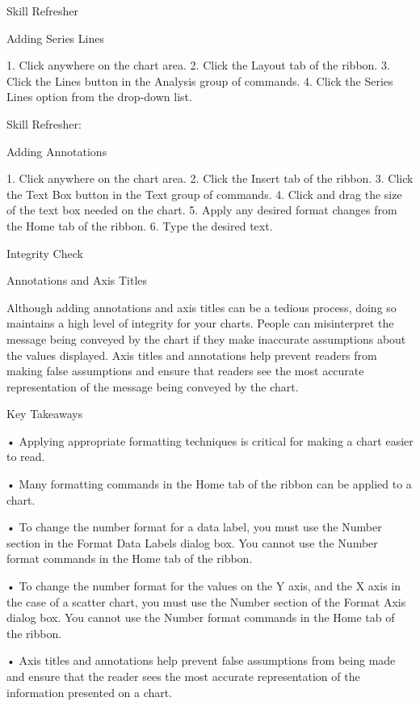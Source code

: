 Skill Refresher


Adding Series Lines

1. Click anywhere on the chart area.
2. Click the Layout tab of the ribbon.
3. Click the Lines button in the Analysis group of commands.
4. Click the Series Lines option from the drop-down list.




Skill Refresher:


Adding Annotations

1. Click anywhere on the chart area.
2. Click the Insert tab of the ribbon.
3. Click the Text Box button in the Text group of commands.
4. Click and drag the size of the text box needed on the chart.
5. Apply any desired format changes from the Home tab of the ribbon.
6. Type the desired text.




Integrity Check

Annotations and Axis Titles

Although adding annotations and axis titles can be a tedious process, doing so maintains a high level of integrity for
your charts. People can misinterpret the message being conveyed by the chart if they make inaccurate assumptions
about the values displayed. Axis titles and annotations help prevent readers from making false assumptions and
ensure that readers see the most accurate representation of the message being conveyed by the chart.





Key Takeaways


• Applying appropriate formatting techniques is critical for making a chart easier to read.

• Many formatting commands in the Home tab of the ribbon can be applied to a chart.

• To change the number format for a data label, you must use the Number section in the Format Data Labels
dialog box. You cannot use the Number format commands in the Home tab of the ribbon.

• To change the number format for the values on the Y axis, and the X axis in the case of a scatter chart, you
must use the Number section of the Format Axis dialog box. You cannot use the Number format commands
in the Home tab of the ribbon.

• Axis titles and annotations help prevent false assumptions from being made and ensure that the reader sees
the most accurate representation of the information presented on a chart.




